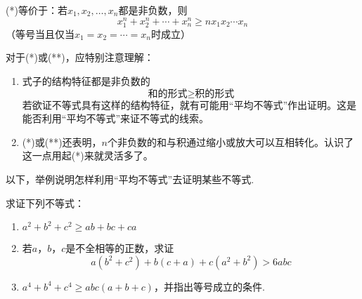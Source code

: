 (*)等价于：若$x_1,x_2,\ldots,x_n$都是非负数，则
\begin{equation}
x^n_1+x^n_2+\cdots +x^n_n  \ge nx_1x_2\cdots x_n \tag{**}
\end{equation}
（等号当且仅当$x_1=x_2=\cdots=x_n$时成立）

对于(*)或(**)，应特别注意理解：
\begin{enumerate}
    \item 式子的结构特征都是非负数的
\[\text{和的形式}\ge \text{积的形式}\]
若欲证不等式具有这样的结构特征，就有可能用“平均不等式”作出证明。这是能否利用“平均不等式”来证不等式的线索。
\item (*)或(**)还表明，$n$个非负数的和与积通过缩小或放大可以互相转化。认识了这一点用起(*)来就灵活多了。
\end{enumerate}


以下，举例说明怎样利用“平均不等式”去证明某些不等式.

\begin{example}
  求证下列不等式：  
\begin{enumerate}[(1)]
    \item $a^2+b^2+c^2\ge ab+bc+ca$
    \item 若$a$，$b$，$c$是不全相等的正数，求证
   \[ a(b^2+c^2)+b(c+a)+c(a^2+b^2)>6abc\]
    \item $a^4+b^4+c^4\ge abc(a+b+c)$，并指出等号成立的条件.
\end{enumerate}
\end{example}
 
